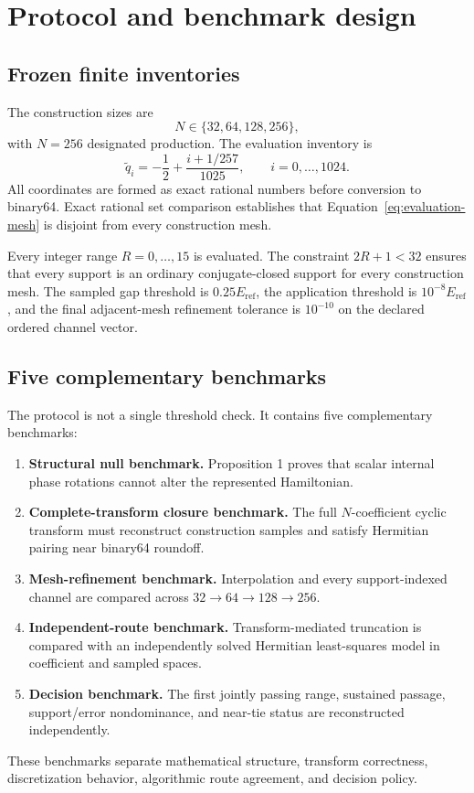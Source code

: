 \documentclass[11pt]{article}
\newcommand{\eref}{E_{\mathrm{ref}}}
\begin{document}
\section{Protocol and benchmark design}

\subsection{Frozen finite inventories}

The construction sizes are
\begin{equation}
 N\in\{32,64,128,256\},
\end{equation}
with $N=256$ designated production.  The evaluation inventory is
\begin{equation}
 \widetilde q_i=-\frac12+\frac{i+1/257}{1025},
 \qquad i=0,\ldots,1024.
 \label{eq:evaluation-mesh}
\end{equation}
All coordinates are formed as exact rational numbers before conversion to binary64.
Exact rational set comparison establishes that Equation~\eqref{eq:evaluation-mesh} is
disjoint from every construction mesh.

Every integer range $R=0,\ldots,15$ is evaluated.  The constraint
$2R+1<32$ ensures that every support is an ordinary conjugate-closed support for every
construction mesh.  The sampled gap threshold is $0.25\eref$, the application threshold
is $10^{-8}\eref$, and the final adjacent-mesh refinement tolerance is $10^{-10}$ on the
declared ordered channel vector.

\subsection{Five complementary benchmarks}

The protocol is not a single threshold check.  It contains five complementary
benchmarks:
\begin{enumerate}
\item \textbf{Structural null benchmark.}  Proposition 1 proves that scalar internal
  phase rotations cannot alter the represented Hamiltonian.
\item \textbf{Complete-transform closure benchmark.}  The full $N$-coefficient cyclic
  transform must reconstruct construction samples and satisfy Hermitian pairing near
  binary64 roundoff.
\item \textbf{Mesh-refinement benchmark.}  Interpolation and every support-indexed
  channel are compared across $32\to64\to128\to256$.
\item \textbf{Independent-route benchmark.}  Transform-mediated truncation is compared
  with an independently solved Hermitian least-squares model in coefficient and sampled
  spaces.
\item \textbf{Decision benchmark.}  The first jointly passing range, sustained passage,
  support/error nondominance, and near-tie status are reconstructed independently.
\end{enumerate}
These benchmarks separate mathematical structure, transform correctness, discretization
behavior, algorithmic route agreement, and decision policy.
\end{document}
